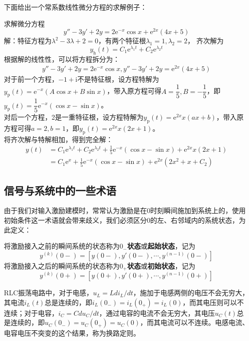 下面给出一个常系数线性微分方程的求解例子：
\begin{example}
    求解微分方程\[y''-3y'+2y=2\mathrm{e}^{-x}\cos x+\mathrm{e}^{2x}(4x+5)\]
解：特征方程为$\lambda^2-3\lambda+2=0$，有两个特征根$\lambda_1=1,\lambda_2=2$，
齐次解为$$y_{\text{h}}(t)=C_1\mathrm{e}^{\lambda_1 t}+C_2\mathrm{e}^{\lambda_2 t}$$
根据解的线性性，可以将方程拆分为：\begin{align*}
    y''-3y'+2y=2\mathrm{e}^{-x}\cos x,y''-3y'+2y=\mathrm{e}^{2x}(4x+5)
\end{align*}
对于前一个方程，$-1+\mathrm{i}$不是特征根，设方程特解为$y_{\text{p}}(t)=\mathrm{e}^{-x}(A\cos x+B\sin x)$，带入原方程可得$A=\dfrac{1}{5},B=-\dfrac{1}{5}$，即$y_{\text{p}}(t)=\dfrac{1}{5}\mathrm{e}^{-x}(\cos x-\sin x)$。\\
对后一个方程，2是一重特征根，设方程特解为$y_{\text{p}}(t)=\mathrm{e}^{2x}x(ax+b)$，带入原方程可得$a=2,b=1$，即$y_{\text{p}}(t)=\mathrm{e}^{2x}x(2x+1)$。\\
将齐次解与特解相加，得到完全解：\begin{align*}
    y(t)&=C_1\mathrm{e}^{\lambda_1 t}+C_2\mathrm{e}^{\lambda_2 t}+\frac{1}{5}\mathrm{e}^{-x}(\cos x-\sin x)+\mathrm{e}^{2x}x(2x+1)\\
    &=C_1 \mathrm{e}^{x}+\frac{1}{5}\mathrm{e}^{-x}(\cos x-\sin x)+\mathrm{e}^{2x}(2x^2+x+C_2)
\end{align*}
\end{example}

\subsection{信号与系统中的一些术语}\label{sub:term_in_ODE}

由于我们对输入激励建模时，常常认为激励是在0时刻瞬间施加到系统上的，使用初始条件这一术语就会带来歧义，我们必须区分0的左、右邻域内的系统状态，为此定义\cite{signal_systems}：
\begin{definition}[起始状态和初始状态]\label{def:initial_state}
    将激励接入之前的瞬间系统的状态称为\textbf{$0_-$状态}或\textbf{起始状态}，记为
    \[y^{(k)}(0-)=[y(0-),y'(0-),\cdots,y^{(n-1)}(0-)]\]
    将激励接入之后的瞬间系统的状态称为\textbf{$0_+$状态}或\textbf{初始状态}，记为
    \[y^{(k)}(0+)=[y(0+),y'(0+),\cdots,y^{(n-1)}(0+)]\]
\end{definition}

\begin{example}[换路定则]
    RLC振荡电路中，对于电感，$u_L=Ldi_L/dt$，施加于电感两侧的电压不会无穷大，其电流$i_L(t)$总是连续的，即$i_L(0_-)=i_L(0_+)=i_L(0)$，而其电压则可以不连续；对于电容，$i_C=Cdu_C/dt$，通过电容的电流不会无穷大，其电压$u_C(t)$总是连续的，即$u_C(0_-)=u_C(0_+)=u_C(0)$，而其电流可以不连续。电感电流、电容电压不突变的这个结果，称为换路定则。
\end{example}

